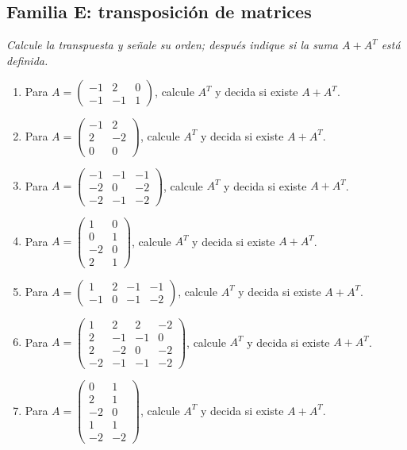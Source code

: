 \documentclass[12pt]{article}
\theoremstyle{remark}
\newcounter{contadorEjercicio}
\newenvironment{listaejercicios}{\begin{enumerate}[label=\textbf{E\arabic*.},leftmargin=2.4em,itemsep=0.52em]\setcounter{enumi}{\value{contadorEjercicio}}}{\setcounter{contadorEjercicio}{\value{enumi}}\end{enumerate}}
\begin{document}
\subsection{Familia E: transposición de matrices}\noindent\textit{Calcule la transpuesta y señale su orden; después indique si la suma $A+A^T$ está definida.}\par\medskip
\begin{listaejercicios}

\item Para $A=\begin{pmatrix}-1&2&0\\-1&-1&1\end{pmatrix}$, calcule $A^T$ y decida si existe $A+A^T$.

\item Para $A=\begin{pmatrix}-1&2\\2&-2\\0&0\end{pmatrix}$, calcule $A^T$ y decida si existe $A+A^T$.

\item Para $A=\begin{pmatrix}-1&-1&-1\\-2&0&-2\\-2&-1&-2\end{pmatrix}$, calcule $A^T$ y decida si existe $A+A^T$.

\item Para $A=\begin{pmatrix}1&0\\0&1\\-2&0\\2&1\end{pmatrix}$, calcule $A^T$ y decida si existe $A+A^T$.

\item Para $A=\begin{pmatrix}1&2&-1&-1\\-1&0&-1&-2\end{pmatrix}$, calcule $A^T$ y decida si existe $A+A^T$.

\item Para $A=\begin{pmatrix}1&2&2&-2\\2&-1&-1&0\\2&-2&0&-2\\-2&-1&-1&-2\end{pmatrix}$, calcule $A^T$ y decida si existe $A+A^T$.

\item Para $A=\begin{pmatrix}0&1\\2&1\\-2&0\\1&1\\-2&-2\end{pmatrix}$, calcule $A^T$ y decida si existe $A+A^T$.


\end{listaejercicios}
\end{document}
